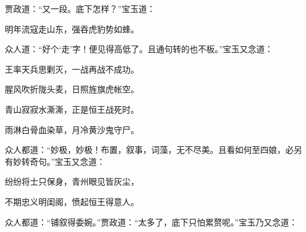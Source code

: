 \begin{parag}
    贾政道：“又一段。底下怎样？”宝玉道：
\end{parag}


\begin{poem}
    \begin{pl}
        明年流寇走山东，强吞虎豹势如蜂。
    \end{pl}
\end{poem}

\begin{parag}
    众人道：“好个‘走’字！便见得高低了。且通句转的也不板。”宝玉又念道：
\end{parag}
\begin{poem}
    \begin{pl}
        王率天兵思剿灭，一战再战不成功。
    \end{pl}
    \begin{pl}
        腥风吹折陇头麦，日照旌旗虎帐空。
    \end{pl}
    \begin{pl}
        青山寂寂水澌澌，正是恒王战死时。
    \end{pl}
    \begin{pl}
        雨淋白骨血染草，月冷黄沙鬼守尸。
    \end{pl}
\end{poem}


\begin{parag}
    众人都道：“妙极，妙极！布置，叙事，词藻，无不尽美。且看如何至四娘，必另有妙转奇句。”宝玉又念道：
\end{parag}


\begin{poem}
    \begin{pl}
        纷纷将士只保身，青州眼见皆灰尘，
    \end{pl}
    \begin{pl}
        不期忠义明闺阁，愤起恒王得意人。
    \end{pl}
\end{poem}

\begin{parag}
    众人都道：“铺叙得委婉。”贾政道：“太多了，底下只怕累赘呢。”宝玉乃又念道：
\end{parag}


